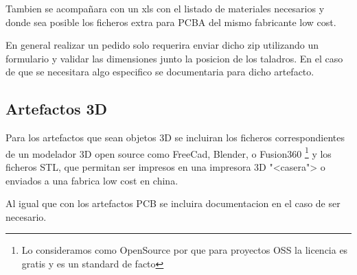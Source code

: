 Tambien se acompañara con un xls con el listado de materiales necesarios y donde sea
posible los ficheros extra para PCBA del mismo fabricante low cost.

En general realizar un pedido solo requerira enviar dicho zip utilizando un formulario
y validar las dimensiones junto la posicion de los taladros. En el caso de que se 
necesitara algo especifico se documentaria para dicho artefacto.

\subsection{Artefactos 3D}
Para los artefactos que sean objetos 3D se incluiran los ficheros
correspondientes de un modelador 3D open source como FreeCad, Blender, o Fusion360
\footnote{Lo consideramos como OpenSource por que para proyectos OSS la licencia es 
gratis y es un standard de facto} y los ficheros STL, 
que permitan ser impresos en una impresora 3D "<casera"> o enviados a una fabrica
low cost en china.

Al igual que con los artefactos PCB se incluira documentacion en el caso de ser
necesario.